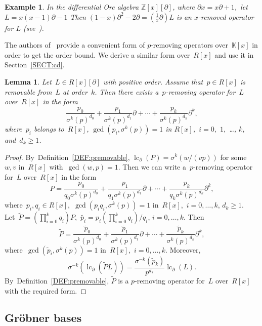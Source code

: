 \documentclass{sig-alternate}
\newcommand{\bZ} { {\mathbb{Z}}}
\newcommand{\lc}{\operatorname{lc}}
\newcommand{\si} { {\sigma}}
\newcommand{\pa}{\partial}
\newtheorem{lemma}[theorem]{Lemma}
\newtheorem{example}[theorem]{Example}
\begin{document}
\begin{example}
In the differential Ore algebra $\bZ[x][\pa]$, where $\pa x = x \pa + 1$,~let~$L = x (x - 1) \pa - 1$
Then $(1 {-} x) \pa^2 {-} 2 \pa {=} \left(\frac{1}{x}\pa \right) L$ is an $x$-removed operator for $L$
(see~\cite[Example 3]{Chen2013}).
\end{example}

The authors of~\cite{Chen2013} provide a convenient form of $p$-removing operators over~$\mathbb{K}[x]$ in order to get the order bound.
We derive a similar form over~$R[x]$ and use it in Section~\ref{SECT:cd}.

\begin{lemma}\label{premovable}
Let~$L \in R[x][\pa]$ with positive order. Assume that~$p \in R[x]$ is removable from~$L$ at order~$k$.
Then there exists a~$p$-removing operator for~$L$ over~$R[x]$ in the form
\[
  \frac{p_0}{\sigma^{k}(p)^{d_0}} + \frac{p_1}{\sigma^{k}(p)^{d_1}} \pa + \cdots
  + \frac{p_{k}}{\sigma^{k}(p)^{d_{k}}} \pa^{k},
\]
where~$p_i$ belongs to~$R[x]$, $\gcd(p_i, \sigma^{k}(p)) = 1$ in $R[x]$,~$i = 0,$ $1,$ \ldots, $k$, and~$d_k \geq 1$.
\end{lemma}
\begin{proof}
By~Definition~\ref{DEF:premovable},
$\lc_\pa(P) = \sigma^k \left(w/(vp)\right)$
for some~$w,v$ in~$R[x]$ with~$\gcd(w,p)=1$.  Then we can write a~$p$-removing operator for~$L$ over~$R[x]$ in the form
\[ P = \frac{p_0}{q_0 \sigma^{k}(p)^{d_0}} + \frac{p_1}{q_1 \sigma^{k}(p)^{d_1}} \pa + \cdots
  + \frac{p_{k}}{q_k \sigma^{k}(p)^{d_{k}}} \pa^{k},
\]
where~$p_i, q_i \in R[x]$,~$\gcd(p_i q_i, \sigma^{k}(p)) = 1$ in~$R[x]$,~$i = 0, \ldots, k$, $d_k \geq 1$.
Let~$\tilde{P} = \left( \prod_{i = 0}^k q_i \right) P$,~$\tilde{p_i} = p_i \left( \prod_{i = 0}^k q_i \right) / q_i$,
$i = 0, \ldots, k$. Then
\[ \tilde{P} = \frac{\tilde{p}_0}{\sigma^{k}(p)^{d_0}} + \frac{\tilde{p}_1}{\sigma^{k}(p)^{d_1}} \pa + \cdots
  + \frac{\tilde{p}_{k}}{\sigma^{k}(p)^{d_{k}}} \pa^{k},
\]
where~$\gcd(\tilde{p}_i, \sigma^{k}(p)) = 1$ in~$R[x]$,~$i = 0, \ldots, k$. Moreover,
$$\si^{-k}(\lc_\pa(\tilde{P} L)) = \frac{\si^{-k}(\tilde{p}_k)}{p^{d_k}} \lc_\pa(L).$$
By~Definition~\ref{DEF:premovable}, $\tilde{P}$ is a $p$-removing operator for~$L$ over~$R[x]$ with the required form.
\end{proof}
\subsection{Gr\"obner bases} \label{SUBSECT:gb}
\end{document}
